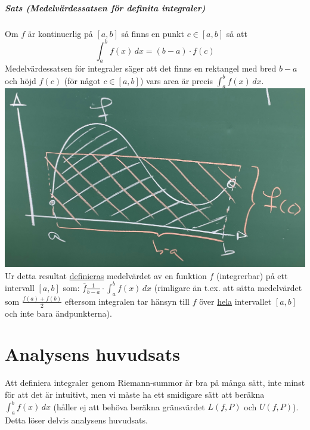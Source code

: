 \paragraph*{Sats (Medelvärdessatsen för definita integraler)}
Om $f$ är kontinuerlig på $[a,b]$ så finns en punkt $c\in[a,b]$ så att
\begin{equation*}
    \int_a^b f(x)\, dx = (b-a) \cdot f(c)
\end{equation*}
Medelvärdessatsen för integraler säger att det finns en rektangel med bred $b-a$ och höjd $f(c)$ (för något $c\in[a,b]$) vars area är precis $\int_a^b f(x)\, dx$.\\
\includegraphics[]{lessons/lesson15/imgs/img07.jpg}\\
Ur detta resultat \underline{definieras} medelvärdet av en funktion $f$ (integrerbar) på ett intervall $[a,b]$ som:
$\overline{f}\frac{1}{b-a}\cdot \int_a^b f(x)\, dx$ (rimligare än t.ex. att sätta medelvärdet som $\frac{f(a)+f(b)}{2}$ eftersom integralen tar hänsyn till $f$ över \underline{hela} intervallet $[a,b]$ och inte bara ändpunkterna).

\chapter{Analysens huvudsats}
Att definiera integraler genom Riemann-summor är bra på många sätt, inte minst för att det är intuitivt, men vi måste ha ett smidigare sätt att beräkna $\int_a^b f(x)\, dx$ (håller ej att behöva beräkna gränsvärdet $L(f,P)$ och $U(f,P)$).
Detta löser delvis analysens huvudsats.

